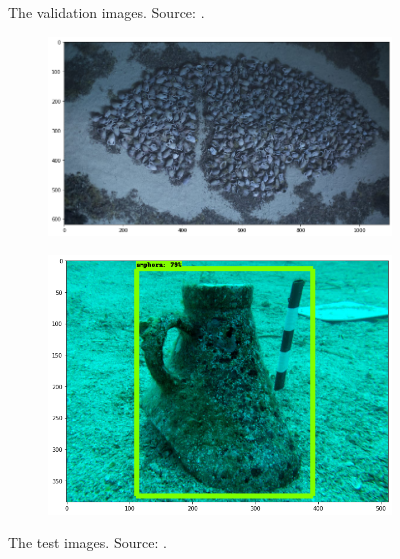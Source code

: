 \documentclass[a4paper, 11pt, oneside]{article}
\begin{document}
\begin{figure}[ht]
\begin{subfigure}[ht]{0.4\textwidth}
    \end{subfigure}
    \caption{The validation images. Source:
    \cite{scuba, itinari, whoi, phoenician, auscape, hakai, groplan}.}
    \label{fig:val}
\end{figure}

  \begin{figure}[ht]
    \centering
    \begin{subfigure}[ht]{0.8\textwidth}
        \centering
        \includegraphics[width=\textwidth]{test_1.png}
    \end{subfigure}
    \bigskip
    \begin{subfigure}[ht]{0.8\textwidth}
        \centering
        \includegraphics[width=\textwidth]{test_2.png}
    \end{subfigure}
    \caption{The test images. Source: \cite{ionian, sanisera}.}
    \label{fig:test}
  \end{figure}
\end{document}
